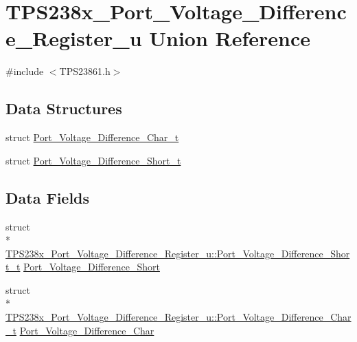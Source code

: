 \hypertarget{union_t_p_s238x___port___voltage___difference___register__u}{\section{T\-P\-S238x\-\_\-\-Port\-\_\-\-Voltage\-\_\-\-Difference\-\_\-\-Register\-\_\-u Union Reference}
\label{union_t_p_s238x___port___voltage___difference___register__u}
}


{\ttfamily \#include $<$T\-P\-S23861.\-h$>$}

\subsection*{Data Structures}
\begin{DoxyCompactItemize}
\item 
struct \hyperlink{struct_t_p_s238x___port___voltage___difference___register__u_1_1_port___voltage___difference___char__t}{Port\-\_\-\-Voltage\-\_\-\-Difference\-\_\-\-Char\-\_\-t}
\item 
struct \hyperlink{struct_t_p_s238x___port___voltage___difference___register__u_1_1_port___voltage___difference___short__t}{Port\-\_\-\-Voltage\-\_\-\-Difference\-\_\-\-Short\-\_\-t}
\end{DoxyCompactItemize}
\subsection*{Data Fields}
\begin{DoxyCompactItemize}
\item 
struct \\*
\hyperlink{struct_t_p_s238x___port___voltage___difference___register__u_1_1_port___voltage___difference___short__t}{T\-P\-S238x\-\_\-\-Port\-\_\-\-Voltage\-\_\-\-Difference\-\_\-\-Register\-\_\-u\-::\-Port\-\_\-\-Voltage\-\_\-\-Difference\-\_\-\-Short\-\_\-t} \hyperlink{union_t_p_s238x___port___voltage___difference___register__u_ab8b9788778b3d05be0fe374834e40395}{Port\-\_\-\-Voltage\-\_\-\-Difference\-\_\-\-Short}
\item 
struct \\*
\hyperlink{struct_t_p_s238x___port___voltage___difference___register__u_1_1_port___voltage___difference___char__t}{T\-P\-S238x\-\_\-\-Port\-\_\-\-Voltage\-\_\-\-Difference\-\_\-\-Register\-\_\-u\-::\-Port\-\_\-\-Voltage\-\_\-\-Difference\-\_\-\-Char\-\_\-t} \hyperlink{union_t_p_s238x___port___voltage___difference___register__u_a6ca90ba515558aff081e7c93770dea92}{Port\-\_\-\-Voltage\-\_\-\-Difference\-\_\-\-Char}
\end{DoxyCompactItemize}


